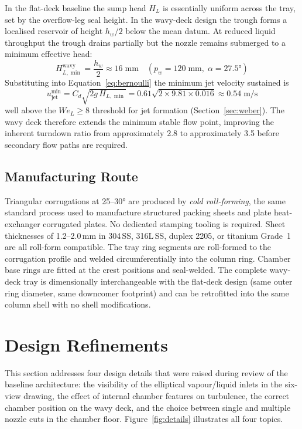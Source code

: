 \documentclass[11pt,letterpaper]{article}
\newcommand{\ujet}{u_{\mathrm{jet}}}
\newcommand{\We}{\mathit{We}}
\begin{document}
In the flat-deck baseline the sump head $H_L$ is essentially uniform
across the tray, set by the overflow-leg seal height.  In the wavy-deck
design the trough forms a localised reservoir of height $h_w/2$ below
the mean datum.  At reduced liquid throughput the trough drains partially
but the nozzle remains submerged to a minimum effective head:
\[
  H_{L,\min}^{\mathrm{wavy}} = \frac{h_w}{2} \approx 16\;\text{mm}
  \quad (p_w = 120\;\text{mm},\;\alpha = 27.5°)
\]
Substituting into Equation~\ref{eq:bernoulli} the minimum jet velocity
sustained is
\[
  \ujet^{\min} = C_d\sqrt{2g\,H_{L,\min}} = 0.61\sqrt{2\times9.81\times0.016}
  \approx 0.54\;\text{m/s}
\]
well above the $\We_L \ge 8$ threshold for jet formation
(Section~\ref{sec:weber}).  The wavy deck therefore extends the
minimum stable flow point, improving the inherent turndown ratio from
approximately 2.8 to approximately 3.5 before secondary flow paths are
required.

\subsection{Manufacturing Route}
\label{sec:wavy_mfg}

Triangular corrugations at 25--30° are produced by \emph{cold roll-forming},
the same standard process used to manufacture structured packing sheets
and plate heat-exchanger corrugated plates.  No dedicated stamping
tooling is required.  Sheet thicknesses of 1.2--2.0\,mm in 304\,SS,
316L\,SS, duplex 2205, or titanium Grade~1 are all roll-form compatible.
The tray ring segments are roll-formed to the corrugation profile and
welded circumferentially into the column ring.  Chamber base rings are
fitted at the crest positions and seal-welded.  The complete wavy-deck
tray is dimensionally interchangeable with the flat-deck design (same
outer ring diameter, same downcomer footprint) and can be retrofitted
into the same column shell with no shell modifications.

\section{Design Refinements}
\label{sec:refinements}

This section addresses four design details that were raised during review of
the baseline architecture: the visibility of the elliptical vapour/liquid
inlets in the six-view drawing, the effect of internal chamber features on
turbulence, the correct chamber position on the wavy deck, and the choice
between single and multiple nozzle cuts in the chamber floor.
Figure~\ref{fig:details} illustrates all four topics.
\end{document}
